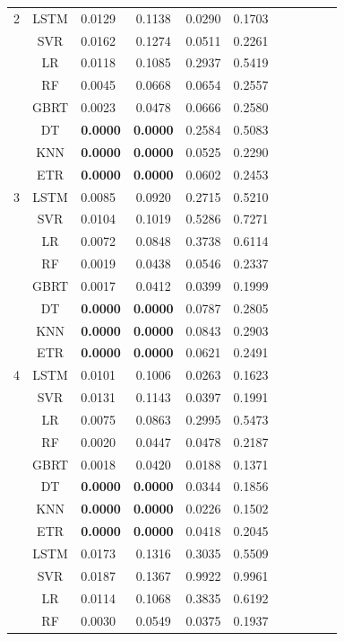{\begin{longtable}{cclcccccccc}
  2 & LSTM & 0.0129 & 0.1138 & 0.0290 & 0.1703  \\
   & SVR & 0.0162 & 0.1274 & 0.0511 & 0.2261 \\
   & LR & 0.0118 & 0.1085 & 0.2937 & 0.5419\\
   & RF & 0.0045 & 0.0668 & 0.0654 & 0.2557 \\
   & GBRT & 0.0023 & 0.0478 & 0.0666 & 0.2580 \\
   & DT & \textbf{0.0000} & \textbf{0.0000} & 0.2584 & 0.5083 \\
   & KNN & \textbf{0.0000} & \textbf{0.0000} & 0.0525 & 0.2290 \\
   & ETR & \textbf{0.0000} & \textbf{0.0000} & 0.0602 & 0.2453 \\
  \hline
  3 & LSTM & 0.0085 & 0.0920 & 0.2715 & 0.5210  \\
   & SVR & 0.0104 & 0.1019 & 0.5286 & 0.7271 \\
   & LR & 0.0072 & 0.0848 & 0.3738 & 0.6114 \\
   & RF & 0.0019 & 0.0438 & 0.0546 & 0.2337 \\
   & GBRT & 0.0017 & 0.0412 & 0.0399 & 0.1999 \\
   & DT & \textbf{0.0000} & \textbf{0.0000} & 0.0787 & 0.2805 \\
   & KNN & \textbf{0.0000} & \textbf{0.0000} & 0.0843 & 0.2903 \\
   & ETR & \textbf{0.0000} & \textbf{0.0000} & 0.0621 & 0.2491 \\
  \hline
  4 & LSTM & 0.0101 & 0.1006 & 0.0263 & 0.1623 \\
   & SVR & 0.0131 & 0.1143 & 0.0397 & 0.1991  \\
   & LR & 0.0075 & 0.0863 & 0.2995 & 0.5473  \\
   & RF & 0.0020 & 0.0447 & 0.0478 & 0.2187  \\
   & GBRT & 0.0018 & 0.0420 & 0.0188 & 0.1371  \\
   & DT & \textbf{0.0000} & \textbf{0.0000} & 0.0344 & 0.1856 \\
   & KNN & \textbf{0.0000} & \textbf{0.0000} & 0.0226 & 0.1502 \\
   & ETR & \textbf{0.0000} & \textbf{0.0000} & 0.0418 & 0.2045 \\
  \newpage
  5 & LSTM & 0.0173 & 0.1316 & 0.3035 & 0.5509 \\
   & SVR & 0.0187 & 0.1367 & 0.9922 & 0.9961 \\
   & LR & 0.0114 & 0.1068 & 0.3835 & 0.6192 \\
   & RF & 0.0030 & 0.0549 & 0.0375 & 0.1937 \\

\end{longtable}}
